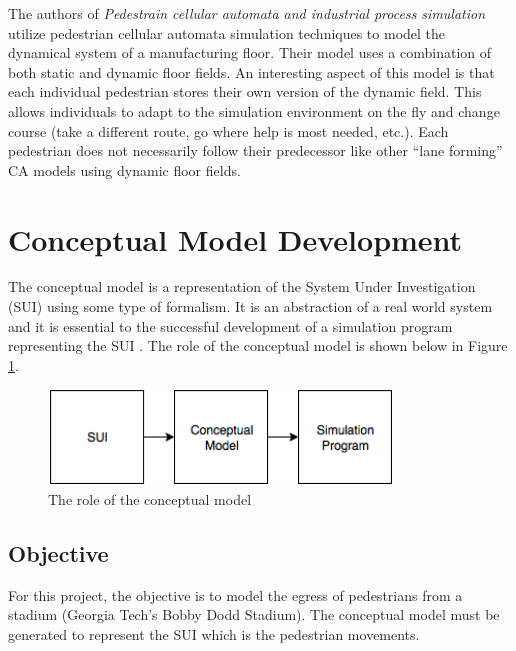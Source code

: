 \documentclass[paper=a4, fontsize=11pt]{scrartcl}
\numberwithin{equation}{section}		%
\numberwithin{figure}{section}			%
\numberwithin{table}{section}		    %
\begin{document}
	\noindent
	The authors of \emph{Pedestrain cellular automata and industrial process simulation} 
	\cite{jolly2008pedestrain} utilize pedestrian cellular automata simulation techniques to model 
	the dynamical system of a manufacturing floor. Their model uses a combination of both static 
	and dynamic floor fields. An interesting aspect of this model is that each individual 
	pedestrian stores their own version of the dynamic field. This allows individuals to adapt to 
	the simulation environment on the fly and change course (take a different route, go where help 
	is most needed, etc.). Each pedestrian does not necessarily follow their predecessor like other 
	``lane forming'' CA models using dynamic floor fields.\\

	\section{Conceptual Model Development}	
	The conceptual model is a representation of the System Under Investigation (SUI) using some 
	type of formalism. It is an abstraction of a real world system and it is essential 
	to the successful development of a simulation program representing the SUI 
	\cite{robinson2013conceptual}. The role of the conceptual model is shown below in Figure 
	\ref{fig:01}. \\
	
	\begin{figure}[H]
		\begin{center} 
			\includegraphics[height=1in,width=3.6in]{sui_mod_sim} 
			\caption{The role of the conceptual model\label{fig:01}} 
		\end{center} 
	\end{figure}
	
	\subsection{Objective}
	For this project, the objective is to model the egress of pedestrians from a stadium (Georgia 
	Tech's Bobby Dodd Stadium). The conceptual model must be generated to represent the SUI which 
	is the pedestrian movements.
	
\end{document}
